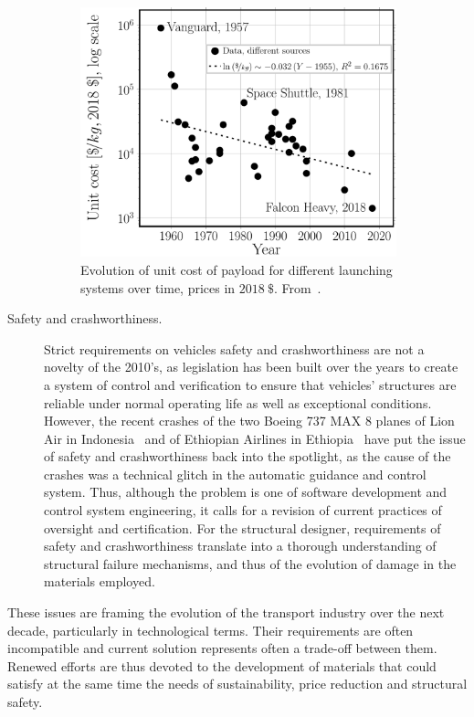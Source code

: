 \begin{description}
\begin{figure}[!h]
\includegraphics[width=0.9\textwidth]{pics/spacetravelcost.pdf}
\caption{Evolution of unit cost of payload for different launching systems over time, prices in $2018\ \$$. From~\cite{Jones2018}.}\label{chap1:fig:spacetravelcost}
\end{figure}

\item[Safety and crashworthiness.] Strict requirements on vehicles safety and crashworthiness are not a novelty of the 2010's, as legislation has been built over the years to create a system of control and verification to ensure that vehicles' structures are reliable under normal operating life as well as exceptional conditions. However, the recent crashes of the two Boeing 737 MAX 8 planes of Lion Air in Indonesia~\cite{aviationSafety2018} and of Ethiopian Airlines in Ethiopia~\cite{aviationSafety2019} have put the issue of safety and crashworthiness back into the spotlight, as the cause of the crashes was a technical glitch in the automatic guidance and control system. Thus, although the problem is one of software development and control system engineering, it calls for a revision of current practices of oversight and certification. For the structural designer, requirements of safety and crashworthiness translate into a thorough understanding of structural failure mechanisms, and thus of the evolution of damage in the materials employed.

\end{description}

These issues are framing the evolution of the transport industry over the next decade, particularly in technological terms. Their requirements are often incompatible and current solution represents often a trade-off between them. Renewed efforts are thus devoted to the development of materials that could satisfy at the same time the needs of sustainability, price reduction and structural safety.

